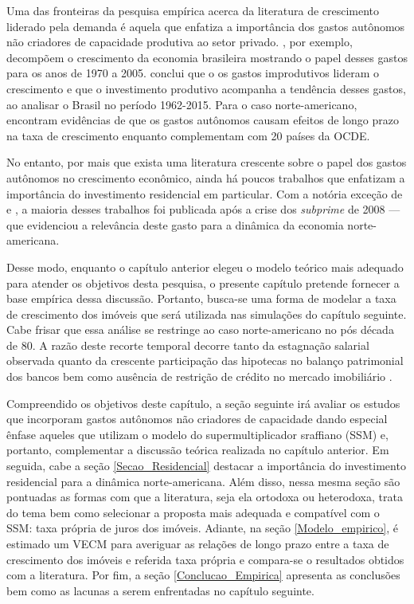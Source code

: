 Uma das fronteiras da pesquisa empírica acerca da literatura de crescimento liderado pela demanda é aquela que enfatiza a importância dos gastos autônomos não criadores de capacidade produtiva ao setor privado. \textcite{freitas_pattern_2013}, por exemplo, decompõem o crescimento da economia brasileira mostrando o papel desses gastos para os anos de  1970 a 2005. \textcite{braga_investment_2018} conclui que o os gastos improdutivos lideram o crescimento e que o investimento produtivo acompanha a tendência desses gastos, ao analisar o Brasil no período 1962-2015. Para o caso norte-americano, \textcite{girardi_long-run_2016} encontram evidências de que os gastos autônomos causam efeitos de longo prazo na taxa de crescimento enquanto \textcite{girardi_autonomous_2018} complementam com 20 países da OCDE. 

No entanto, por mais que exista uma literatura crescente sobre o papel dos gastos autônomos no crescimento econômico, ainda há poucos trabalhos que enfatizam a importância do investimento residencial em particular. Com a notória exceção de \textcite{green_follow_1997} e \textcite{leamer_housing_2007}, a maioria desses trabalhos foi publicada após a crise dos \textit{subprime} de 2008 --- que evidenciou a relevância deste gasto para a dinâmica da economia norte-americana.

Desse modo, enquanto o capítulo anterior elegeu o modelo teórico mais adequado para atender os objetivos desta pesquisa, o presente capítulo pretende fornecer a base empírica dessa discussão. Portanto, busca-se uma forma de modelar a taxa de crescimento dos imóveis que será utilizada nas simulações do capítulo seguinte. 
Cabe frisar que essa análise se restringe ao caso norte-americano no pós década de 80. A razão deste recorte temporal decorre tanto da estagnação salarial observada \cite{teixeira_uma_2011} quanto da crescente participação das hipotecas no balanço patrimonial dos bancos \cite{jorda_great_2014} bem como ausência de restrição de crédito no mercado imobiliário \cites{linneman_impacts_1989}{duca_empirical_1991}. 


Compreendido os objetivos deste capítulo, a seção seguinte irá avaliar os estudos que incorporam gastos autônomos não criadores de capacidade dando especial ênfase aqueles que utilizam o modelo do supermultiplicador sraffiano (SSM) e, portanto, complementar a discussão teórica realizada no capítulo anterior. Em seguida, cabe a seção \ref{Secao_Residencial} destacar a importância do investimento residencial para a dinâmica norte-americana. Além disso, nessa mesma seção são pontuadas as formas com que a literatura, seja ela ortodoxa ou heterodoxa, trata do tema bem como selecionar a proposta mais adequada e compatível com o SSM: taxa própria de juros dos imóveis. Adiante, na seção \ref{Modelo_empirico}, é estimado um VECM  para averiguar as relações de longo prazo entre a taxa de crescimento dos imóveis e referida taxa própria e compara-se o resultados obtidos com a literatura. Por fim, a seção \ref{Conclucao_Empirica} apresenta as conclusões bem como as lacunas a serem enfrentadas no capítulo seguinte.